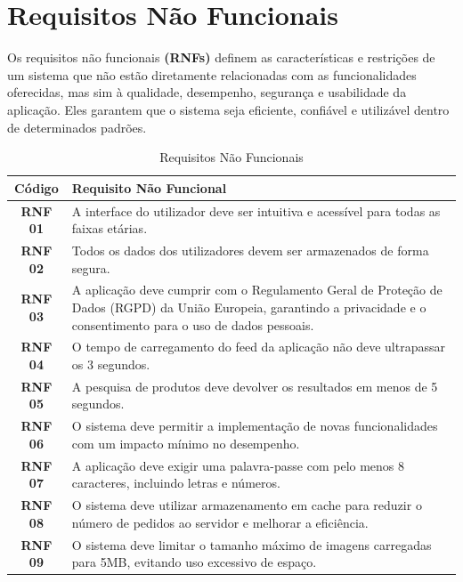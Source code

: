 \documentclass[a4paper, 12pt]{article} %
\begin{document}

\newpage
\section{Requisitos Não Funcionais}

Os requisitos não funcionais \textbf{(RNFs)} definem as características e restrições de um sistema que não estão diretamente relacionadas com as funcionalidades oferecidas, mas sim à qualidade, desempenho, segurança e usabilidade da aplicação. Eles garantem que o sistema seja eficiente, confiável e utilizável dentro de determinados padrões.

\begin{table}[H]
	\centering
	\renewcommand{\arraystretch}{1.3}
	\begin{tabular}{|c|p{12cm}|}
		\hline
		\textbf{Código} & \textbf{Requisito Não Funcional} \\
		\hline
		\textbf{RNF 01} & A interface do utilizador deve ser intuitiva e acessível para todas as faixas etárias. \\
		\hline
		\textbf{RNF 02} & Todos os dados dos utilizadores devem ser armazenados de forma segura. \\
		\hline
		\textbf{RNF 03} & A aplicação deve cumprir com o Regulamento Geral de Proteção de Dados (RGPD) da União Europeia, garantindo a privacidade e o consentimento para o uso de dados pessoais. \\
		\hline
		\textbf{RNF 04} & O tempo de carregamento do feed da aplicação não deve ultrapassar os 3 segundos. \\
		\hline
		\textbf{RNF 05} & A pesquisa de produtos deve devolver os resultados em menos de 5 segundos.\\
		\hline
		\textbf{RNF 06} & O sistema deve permitir a implementação de novas funcionalidades com um impacto mínimo no desempenho. \\
		\hline
		\textbf{RNF 07} & A aplicação deve exigir uma palavra-passe com pelo menos 8 caracteres, incluindo letras e números. \\
		\hline
		\textbf{RNF 08} & O sistema deve utilizar armazenamento em cache para reduzir o número de pedidos ao servidor e melhorar a eficiência. \\
		\hline
		\textbf{RNF 09} & O sistema deve limitar o tamanho máximo de imagens carregadas para 5MB, evitando uso excessivo de espaço. \\
		\hline
	\end{tabular}
	\caption{Requisitos Não Funcionais}
	\label{tab:requisitos_nao_funcionais}
\end{table}
\end{document}
